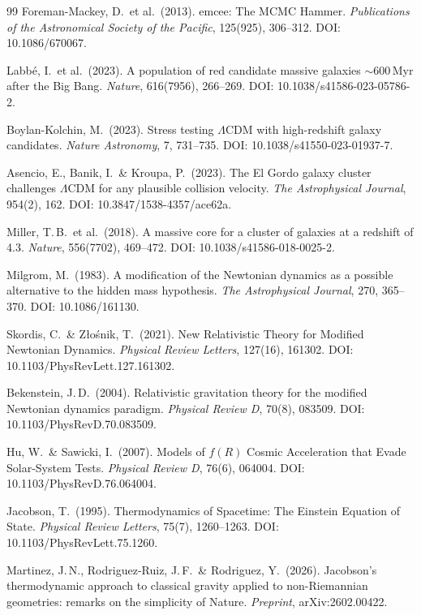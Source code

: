 \documentclass[aps,prd,twocolumn,superscriptaddress,nofootinbib]{revtex4-2}
\begin{document}
\begin{thebibliography}{99}
Foreman-Mackey, D.\ et al.\ (2013).
emcee: The MCMC Hammer.
\textit{Publications of the Astronomical Society of the Pacific}, 125(925), 306--312.
DOI: 10.1086/670067.

Labb\'e, I.\ et al.\ (2023).
A population of red candidate massive galaxies $\sim$600\,Myr after the Big Bang.
\textit{Nature}, 616(7956), 266--269.
DOI: 10.1038/s41586-023-05786-2.

Boylan-Kolchin, M.\ (2023).
Stress testing $\Lambda$CDM with high-redshift galaxy candidates.
\textit{Nature Astronomy}, 7, 731--735.
DOI: 10.1038/s41550-023-01937-7.

Asencio, E., Banik, I.\ \& Kroupa, P.\ (2023).
The El Gordo galaxy cluster challenges $\Lambda$CDM for any plausible collision velocity.
\textit{The Astrophysical Journal}, 954(2), 162.
DOI: 10.3847/1538-4357/ace62a.

Miller, T.\,B.\ et al.\ (2018).
A massive core for a cluster of galaxies at a redshift of 4.3.
\textit{Nature}, 556(7702), 469--472.
DOI: 10.1038/s41586-018-0025-2.

Milgrom, M.\ (1983).
A modification of the Newtonian dynamics as a possible alternative to the hidden mass hypothesis.
\textit{The Astrophysical Journal}, 270, 365--370.
DOI: 10.1086/161130.

Skordis, C.\ \& Z{\l}o\'snik, T.\ (2021).
New Relativistic Theory for Modified Newtonian Dynamics.
\textit{Physical Review Letters}, 127(16), 161302.
DOI: 10.1103/PhysRevLett.127.161302.

Bekenstein, J.\,D.\ (2004).
Relativistic gravitation theory for the modified Newtonian dynamics paradigm.
\textit{Physical Review D}, 70(8), 083509.
DOI: 10.1103/PhysRevD.70.083509.

Hu, W.\ \& Sawicki, I.\ (2007).
Models of $f(R)$ Cosmic Acceleration that Evade Solar-System Tests.
\textit{Physical Review D}, 76(6), 064004.
DOI: 10.1103/PhysRevD.76.064004.

Jacobson, T.\ (1995).
Thermodynamics of Spacetime: The Einstein Equation of State.
\textit{Physical Review Letters}, 75(7), 1260--1263.
DOI: 10.1103/PhysRevLett.75.1260.

Martinez, J.\,N., Rodriguez-Ruiz, J.\,F.\ \& Rodriguez, Y.\ (2026).
Jacobson's thermodynamic approach to classical gravity applied to non-Riemannian geometries: remarks on the simplicity of Nature.
\textit{Preprint}, arXiv:2602.00422.


\end{thebibliography}
\end{document}

